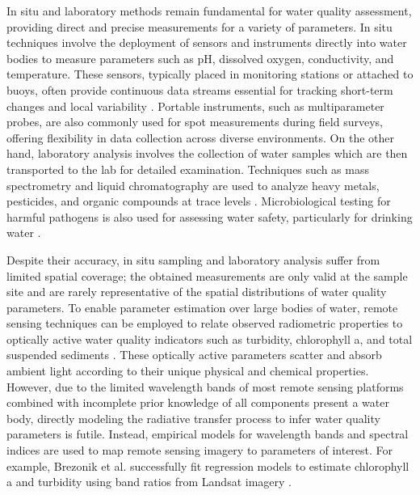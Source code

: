In situ and laboratory methods remain fundamental for water quality assessment,
providing direct and precise measurements for a variety of parameters. In situ
techniques involve the deployment of sensors and
instruments directly into water bodies to measure parameters such as pH,
dissolved oxygen, conductivity, and temperature. These sensors,
typically placed in monitoring stations or attached to buoys, often provide continuous
data streams essential for tracking short-term changes and local variability
\cite{in-situ-water-quality}. Portable instruments, such as multiparameter probes, are
also commonly used for spot measurements during field surveys, offering
flexibility in data collection across diverse environments. On the other hand,
laboratory analysis involves the collection of water samples which are then
transported to the lab for detailed examination.
Techniques such as mass spectrometry and liquid chromatography are used to
analyze heavy metals, pesticides, and organic compounds at
trace levels \cite{mass-spec-water, lc-ms}. Microbiological testing for harmful
pathogens is also used for assessing water safety, particularly for drinking
water \cite{microbio-methods}.

Despite their accuracy, in situ sampling and laboratory analysis suffer from
limited spatial coverage; the obtained measurements are only valid at the sample
site and are rarely representative of the spatial distributions of water quality
parameters. To enable parameter estimation over large bodies of water, remote sensing
techniques can be employed to relate observed radiometric properties to
optically active  water quality indicators such as turbidity, chlorophyll a, and
total suspended sediments \cite{remote-sensing-wq}. These optically active parameters
scatter and absorb ambient light according to their unique physical and chemical
properties. However, due to the limited wavelength bands of most remote sensing platforms
combined with incomplete prior knowledge of all components present a water body,
directly modeling the radiative transfer process to infer water quality
parameters is futile. Instead, empirical models for wavelength bands and
spectral indices are used to map remote sensing imagery to parameters of interest.
For example, Brezonik et al. successfully fit regression models to estimate
chlorophyll a and turbidity using band ratios from Landsat imagery \cite{brezonik-wq}.

